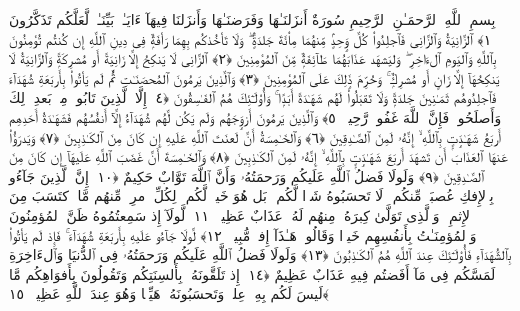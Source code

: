 
  
    
  
    
    

\nopagebreak
  بِسمِ ٱللَّهِ ٱلرَّحمَـٰنِ ٱلرَّحِيمِ
  سُورَةٌ أَنزَلنَـٰهَا وَفَرَضنَـٰهَا وَأَنزَلنَا فِيهَآ ءَايَـٰتٍۭ بَيِّنَـٰتٍۢ لَّعَلَّكُم تَذَكَّرُونَ ﴿١﴾
 ٱلزَّانِيَةُ وَٱلزَّانِى فَٱجلِدُوا۟ كُلَّ وَٟحِدٍۢ مِّنهُمَا مِا۟ئَةَ جَلدَةٍۢ ۖ وَلَا تَأخُذكُم بِهِمَا رَأفَةٌۭ فِى دِينِ ٱللَّهِ إِن كُنتُم تُؤمِنُونَ بِٱللَّهِ وَٱليَومِ ٱلءَاخِرِ ۖ وَليَشهَد عَذَابَهُمَا طَآئِفَةٌۭ مِّنَ ٱلمُؤمِنِينَ ﴿٢﴾
 ٱلزَّانِى لَا يَنكِحُ إِلَّا زَانِيَةً أَو مُشرِكَةًۭ وَٱلزَّانِيَةُ لَا يَنكِحُهَآ إِلَّا زَانٍ أَو مُشرِكٌۭ ۚ وَحُرِّمَ ذَٟلِكَ عَلَى ٱلمُؤمِنِينَ ﴿٣﴾
 وَٱلَّذِينَ يَرمُونَ ٱلمُحصَنَـٰتِ ثُمَّ لَم يَأتُوا۟ بِأَربَعَةِ شُهَدَآءَ فَٱجلِدُوهُم ثَمَـٰنِينَ جَلدَةًۭ وَلَا تَقبَلُوا۟ لَهُم شَهَـٰدَةً أَبَدًۭا ۚ وَأُو۟لَـٰٓئِكَ هُمُ ٱلفَـٰسِقُونَ ﴿٤﴾
 إِلَّا ٱلَّذِينَ تَابُوا۟ مِنۢ بَعدِ ذَٟلِكَ وَأَصلَحُوا۟ فَإِنَّ ٱللَّهَ غَفُورٌۭ رَّحِيمٌۭ ﴿٥﴾
 وَٱلَّذِينَ يَرمُونَ أَزوَٟجَهُم وَلَم يَكُن لَّهُم شُهَدَآءُ إِلَّآ أَنفُسُهُم فَشَهَـٰدَةُ أَحَدِهِم أَربَعُ شَهَـٰدَٟتٍۭ بِٱللَّهِ ۙ إِنَّهُۥ لَمِنَ ٱلصَّـٰدِقِينَ ﴿٦﴾
 وَٱلخَـٰمِسَةُ أَنَّ لَعنَتَ ٱللَّهِ عَلَيهِ إِن كَانَ مِنَ ٱلكَـٰذِبِينَ ﴿٧﴾
 وَيَدرَؤُا۟ عَنهَا ٱلعَذَابَ أَن تَشهَدَ أَربَعَ شَهَـٰدَٟتٍۭ بِٱللَّهِ ۙ إِنَّهُۥ لَمِنَ ٱلكَـٰذِبِينَ ﴿٨﴾
 وَٱلخَـٰمِسَةَ أَنَّ غَضَبَ ٱللَّهِ عَلَيهَآ إِن كَانَ مِنَ ٱلصَّـٰدِقِينَ ﴿٩﴾
 وَلَولَا فَضلُ ٱللَّهِ عَلَيكُم وَرَحمَتُهُۥ وَأَنَّ ٱللَّهَ تَوَّابٌ حَكِيمٌ ﴿١٠﴾
 إِنَّ ٱلَّذِينَ جَآءُو بِٱلإِفكِ عُصبَةٌۭ مِّنكُم ۚ لَا تَحسَبُوهُ شَرًّۭا لَّكُم ۖ بَل هُوَ خَيرٌۭ لَّكُم ۚ لِكُلِّ ٱمرِئٍۢ مِّنهُم مَّا ٱكتَسَبَ مِنَ ٱلإِثمِ ۚ وَٱلَّذِى تَوَلَّىٰ كِبرَهُۥ مِنهُم لَهُۥ عَذَابٌ عَظِيمٌۭ ﴿١١﴾
 لَّولَآ إِذ سَمِعتُمُوهُ ظَنَّ ٱلمُؤمِنُونَ وَٱلمُؤمِنَـٰتُ بِأَنفُسِهِم خَيرًۭا وَقَالُوا۟ هَـٰذَآ إِفكٌۭ مُّبِينٌۭ ﴿١٢﴾
 لَّولَا جَآءُو عَلَيهِ بِأَربَعَةِ شُهَدَآءَ ۚ فَإِذ لَم يَأتُوا۟ بِٱلشُّهَدَآءِ فَأُو۟لَـٰٓئِكَ عِندَ ٱللَّهِ هُمُ ٱلكَـٰذِبُونَ ﴿١٣﴾
 وَلَولَا فَضلُ ٱللَّهِ عَلَيكُم وَرَحمَتُهُۥ فِى ٱلدُّنيَا وَٱلءَاخِرَةِ لَمَسَّكُم فِى مَآ أَفَضتُم فِيهِ عَذَابٌ عَظِيمٌ ﴿١٤﴾
 إِذ تَلَقَّونَهُۥ بِأَلسِنَتِكُم وَتَقُولُونَ بِأَفوَاهِكُم مَّا لَيسَ لَكُم بِهِۦ عِلمٌۭ وَتَحسَبُونَهُۥ هَيِّنًۭا وَهُوَ عِندَ ٱللَّهِ عَظِيمٌۭ ﴿١٥﴾
